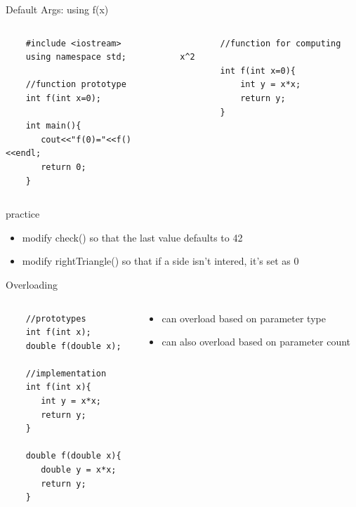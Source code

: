 \documentclass[xcolor={dvipsnames}]{beamer}
\begin{document}
\begin{frame}[fragile]{Default Args: using f(x)}
	\begin{columns}
	 \begin{column}{.49\textwidth}
	\begin{verbatim}
	#include <iostream>
	using namespace std;
		
	//function prototype
	int f(int x=0);

	int main(){
	   cout<<"f(0)="<<f()<<endl;
	   return 0;
	}
	\end{verbatim}
	\end{column}
	\pause
	\begin{column}{.49\textwidth}
		\begin{verbatim}
		//function for computing x^2
		int f(int x=0){
		    int y = x*x;
		    return y;
		}   
	\end{verbatim}
	\end{column}
	\end{columns}
\end{frame}

\begin{frame}{practice}
	\begin{itemize}
		\item modify check() so that the last value defaults to 42
		\item modify rightTriangle() so that if a side isn't intered, it's set as 0
	\end{itemize}
\end{frame}

\begin{frame}[fragile]{Overloading}

	\begin{columns}
	\begin{column}{.49\textwidth}
	\begin{verbatim}
	//prototypes
	int f(int x);
	double f(double x);
	
	//implementation
	int f(int x){
	   int y = x*x;
	   return y;
	}
   
	double f(double x){
	   double y = x*x;
	   return y;
	}   
	\end{verbatim}
	\end{column}
	\begin{column}{.49\textwidth}
	\begin{itemize}
		\item can overload based on parameter type
		\item can also overload based on parameter count
	\end{itemize}
	\end{column}
	\end{columns}
\end{frame}
\end{document}
